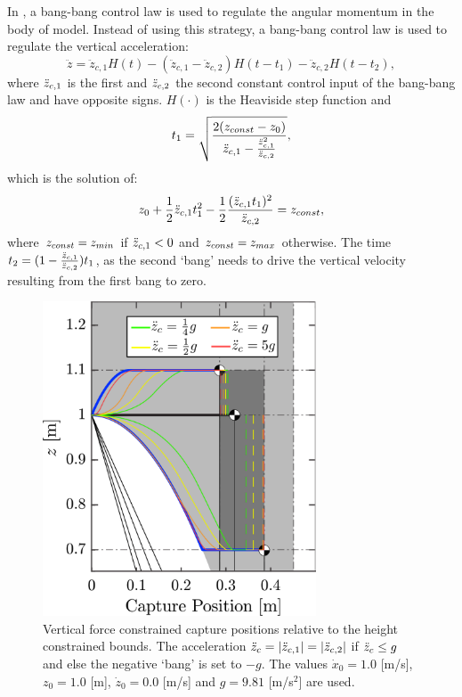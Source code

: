 In \cite{pratt2006capture,stephens2007humanoid,koolen2012capturability}, a bang-bang control law is used to regulate the angular momentum in the body of model. Instead of using this strategy, a bang-bang control law is used to regulate the vertical acceleration:
\begin{equation}
	\ddot{z} = \ddot{z}_{c,1}H(t) - (\ddot{z}_{c,1} - \ddot{z}_{c,2})H(t-t_1) - \ddot{z}_{c,2}H(t-t_2),
\end{equation}
where $\ddot{z}_{c,1}$ is the first and $\ddot{z}_{c,2}$ the second constant control input of the bang-bang law and have opposite signs. $H(\cdot)$ is the Heaviside step function and 
\begin{equation}
t_1=\sqrt{\frac{2(z_{const}-z_0)}{\ddot{z}_{c,1} - \frac{\ddot{z}_{c,1}^2}{\ddot{z}_{c,2}}}},
\end{equation}
which is the solution of:
\begin{equation}
	z_0+\frac{1}{2}\ddot{z}_{c,1} t_1^2 - \frac{1}{2}\frac{(\ddot{z}_{c,1} t_1)^2}{\ddot{z}_{c,2}}= z_{const},
\end{equation}
where $z_{const}=z_{min}$ if $\ddot{z}_{c,1} <0$ and $z_{const}=z_{max}$ otherwise. The time $t_2=(1-\frac{\ddot{z}_{c,1}}{\ddot{z}_{c,2}})t_1$, as the second `bang' needs to drive the vertical velocity resulting from the first bang to zero. 
\begin{figure}
      \centering
      \includegraphics[width=3.2in]{STYLESTUFF/CPLimitsForce.png}
      \caption{Vertical force constrained capture positions relative to the height constrained bounds. The acceleration $\ddot{z}_{c}=|\ddot{z}_{c,1}|=|\ddot{z}_{c,2}|$ if $\ddot{z}_{c} \leq g$ and else the negative `bang' is set to $-g$. The values $\dot{x}_0=1.0$ [m/s], $z_0=1.0$ [m], $\dot{z}_0=0.0$ [m/s] and $g=9.81$ [m/s$^2$] are used.}
      \label{fig:zvsf}
\end{figure}

